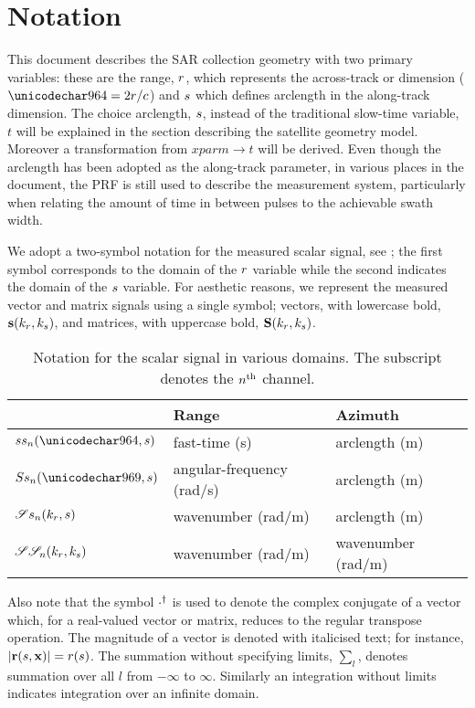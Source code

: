 \section{Notation}
\label{sc:notation}
This document describes the SAR collection geometry with two primary variables: these are the range, $r$, which represents the across-track or  dimension ($\fasttime = 2\range/c$) and $s$ which defines arclength in the along-track dimension. The choice arclength, $s$, instead of the traditional slow-time variable, $t$ will be explained in the section describing the satellite geometry model. Moreover a transformation from $xparm\rightarrow t$ will be derived. Even though the arclength has been adopted as the along-track parameter, in various places in the document, the PRF is still used to describe the measurement system, particularly when relating the amount of time in between pulses to the achievable swath width.
\par
We adopt a two-symbol notation for the measured scalar signal, see ; the first symbol corresponds to the domain of the $r$ variable while the second indicates the domain of the $s$ variable. For aesthetic reasons, we represent the measured vector and matrix signals using a single symbol; vectors, with lowercase bold, $\mathbf{s}(k_r,k_{s})$, and matrices, with uppercase bold, $\SkSkM(\kr,\kparm)$.
\begin{table}[b!]
\begin{center}
\begin{tabular}{l|l|l}
 & {\bf Range} & {\bf Azimuth}\\\hline
 $\stst{\channelIndex}(\fasttime, \parm)$ & fast-time (s) & arclength (m)\\\hline
 $\Sfst{\channelIndex}(\omega, \parm)$ & angular-frequency (rad/s) & arclength (m)\\\hline
 $\mathscr{S}s_{n}(k_r, s)$ & wavenumber (rad/m) & arclength (m)\\\hline
 $\mathscr{S}\mathscr{S}_{n}(k_r, k_{s})$ & wavenumber (rad/m) & wavenumber (rad/m)\\\hline
\end{tabular}
\caption{Notation for the scalar signal in various domains. The subscript denotes the $n^\text{th}$ channel.}
\label{tb:notation}
\end{center}
\end{table}
Also note that the symbol $\cdot^\dagger$ is used to denote the complex conjugate of a vector which, for a real-valued vector or matrix, reduces to the regular transpose operation. The magnitude of a vector is denoted with italicised text; for instance, $\lvert\mathbf{r}(s, \mathbf{\mathbf{x}})\rvert = \mathnormal{r}(s)$. The summation without specifying limits, $\sum_l$, denotes summation over all $l$ from $-\infty$ to $\infty$. Similarly an integration without limits indicates integration over an infinite domain.
